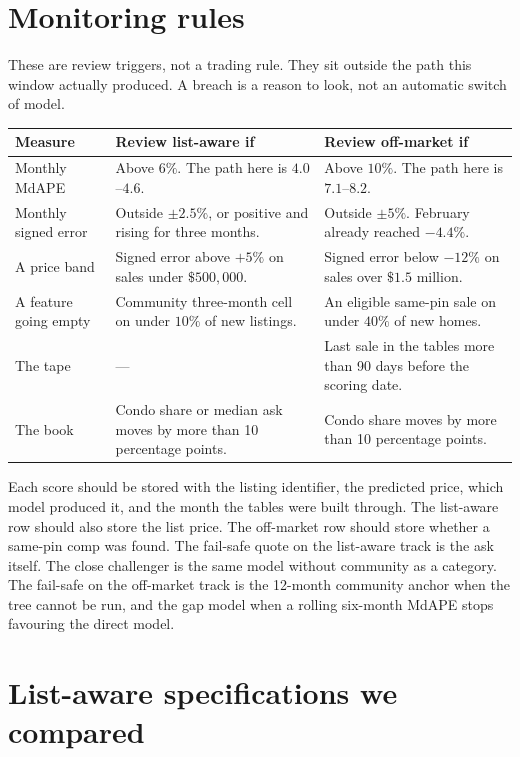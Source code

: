 \documentclass[11pt]{article}
\newcommand{\la}{list-aware}
\newcommand{\om}{off-market}
\begin{document}
\appendix
\section{Monitoring rules}
\label{app:monitor}

These are review triggers, not a trading rule. They sit outside the path this window actually produced. A breach is a reason to look, not an automatic switch of model.

\begin{center}
\small
\begin{tabular}{p{3.4cm}p{5.6cm}p{5.4cm}}
\toprule
Measure & Review \la{} if & Review \om{} if \\
\midrule
Monthly MdAPE & Above \(6\%\). The path here is \(4.0\)--\(4.6\). & Above \(10\%\). The path here is \(7.1\)--\(8.2\). \\
Monthly signed error & Outside \(\pm 2.5\%\), or positive and rising for three months. & Outside \(\pm 5\%\). February already reached \(-4.4\%\). \\
A price band & Signed error above \(+5\%\) on sales under \(\$500{,}000\). & Signed error below \(-12\%\) on sales over \(\$1.5\) million. \\
A feature going empty & Community three-month cell on under \(10\%\) of new listings. & An eligible same-pin sale on under \(40\%\) of new homes. \\
The tape & --- & Last sale in the tables more than 90 days before the scoring date. \\
The book & Condo share or median ask moves by more than 10 percentage points. & Condo share moves by more than 10 percentage points. \\
\bottomrule
\end{tabular}
\end{center}

Each score should be stored with the listing identifier, the predicted price, which model produced it, and the month the tables were built through. The list-aware row should also store the list price. The off-market row should store whether a same-pin comp was found. The fail-safe quote on the list-aware track is the ask itself. The close challenger is the same model without community as a category. The fail-safe on the off-market track is the 12-month community anchor when the tree cannot be run, and the gap model when a rolling six-month MdAPE stops favouring the direct model.

\section{List-aware specifications we compared}
\label{app:ladder-la}
\end{document}
